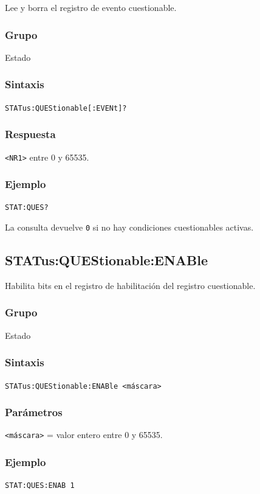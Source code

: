 Lee y borra el registro de evento cuestionable.

\subsubsection*{Grupo}
Estado

\subsubsection*{Sintaxis}
\texttt{STATus:QUEStionable[:EVENt]?}

\subsubsection*{Respuesta}
\texttt{<NR1>} entre 0 y 65535.

\subsubsection*{Ejemplo}
\texttt{STAT:QUES?}

La consulta devuelve \texttt{0} si no hay condiciones cuestionables
activas.

\subsection*{STATus:QUEStionable:ENABle}

Habilita bits en el registro de habilitación del registro cuestionable.

\subsubsection*{Grupo}
Estado

\subsubsection*{Sintaxis}
\texttt{STATus:QUEStionable:ENABle <máscara>}

\subsubsection*{Parámetros}
\texttt{<máscara>} = valor entero entre 0 y 65535.

\subsubsection*{Ejemplo}
\texttt{STAT:QUES:ENAB 1}

